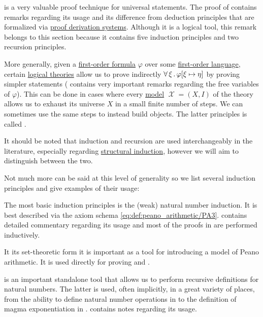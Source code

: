 \begin{remark}\label{rem:induction}
   is a very valuable proof technique for universal statements. The proof of  contains remarks regarding its usage and its difference from deduction principles that are formalized via \hyperref[def:proof_derivation_system]{proof derivation systems}. Although it is a logical tool, this remark belongs to this section because it contains five induction principles and two recursion principles.

  More generally, given a \hyperref[def:first_order_formula]{first-order formula} \( \varphi \) over some \hyperref[def:first_order_syntax]{first-order language}, certain \hyperref[def:first_order_theory]{logical theories} allow us to prove indirectly \( \forall \thinspace \xi \thinspace . \thinspace \varphi[\xi \mapsto \eta] \) by proving simpler statements ( contains very important remarks regarding the free variables of \( \varphi \)). This can be done in cases where every \hyperref[def:first_order_semantics/satisfiability]{model} \( \mscrX = (X, I) \) of the theory allows us to exhaust its universe \( X \) in a small finite number of steps. We can sometimes use the same steps to instead build objects. The latter principles is called .

  It should be noted that induction and recursion are used interchangeably in the literature, especially regarding \hyperref[rem:structural_recursion_and_induction]{structural induction}, however we will aim to distinguish between the two.

  Not much more can be said at this level of generality so we list several induction principles and give examples of their usage:
  \begin{thmenum}
     The most basic induction principles is the (weak) natural number induction. It is best described via the axiom schema \eqref{eq:def:peano_arithmetic/PA3}.  contains detailed commentary regarding its usage and most of the proofs in  are performed inductively.

    It its set-theoretic form  it is important as a tool for introducing a model of Peano arithmetic. It is used directly for proving  and .

     is an important standalone tool that allows us to perform recursive definitions for natural numbers. The latter is used, often implicitly, in a great variety of places, from the ability to define natural number operations in  to the definition of magma exponentiation in .  contains notes regarding its usage.


\end{thmenum}
\end{remark}
